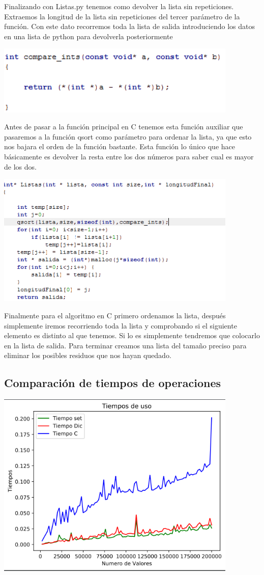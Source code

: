 \documentclass{article}
\begin{document}
Finalizando con Listas.py tenemos como devolver la lista sin repeticiones. Extraemos la longitud de la lista sin repeticiones del tercer parámetro de la función. Con este dato recorremos toda la lista de salida introduciendo los datos en una lista de python para devolverla posteriormente

\includegraphics[width=11.5cm]{Comparacion.PNG}

Antes de pasar a la función principal en C tenemos esta función auxiliar que pasaremos a la función qsort como parámetro para ordenar la lista, ya que esto nos bajara el orden de la función bastante. Esta función lo único que hace básicamente es devolver la resta entre los dos números para saber cual es mayor de los dos.

\includegraphics[width=11.5cm]{C.PNG}

Finalmente para el algoritmo en C primero ordenamos la lista, después simplemente iremos recorriendo toda la lista y comprobando si el siguiente elemento es distinto al que tenemos. Si lo es simplemente tendremos que colocarlo en la lista de salida. Para terminar creamos una lista del tamaño preciso para eliminar los posibles residuos que nos hayan quedado.

\subsection{Comparación de tiempos de operaciones}
\includegraphics[width=11.5cm]{PDF.PNG}
\end{document}
